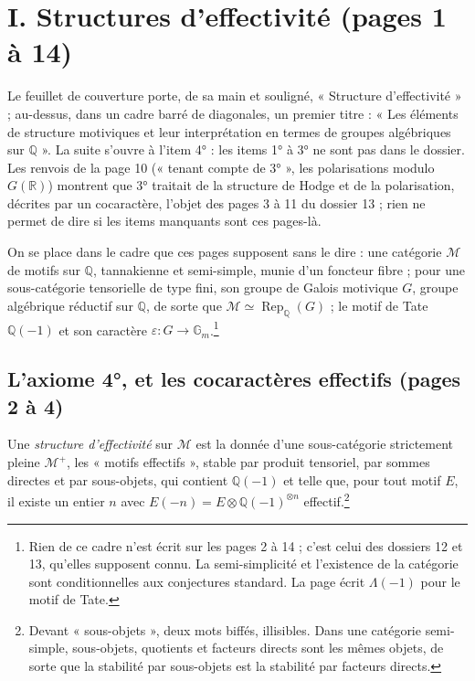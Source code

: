 \documentclass[11pt,a4paper]{article}
\begin{document}
\section*{I. Structures d'effectivité (pages 1 à 14)}

Le feuillet de couverture porte, de sa main et souligné, « Structure
d'effectivité » ; au-dessus, dans un cadre barré de diagonales, un premier
titre : « Les éléments de structure motiviques et leur interprétation en termes
de groupes algébriques sur $\mathbb{Q}$ ». La suite s'ouvre à l'item 4° : les
items 1° à 3° ne sont pas dans le dossier. Les renvois de la page 10
(« tenant compte de 3° », les polarisations modulo $G(\mathbb{R})$) montrent
que 3° traitait de la structure de Hodge et de la polarisation, décrites par un
cocaractère, l'objet des pages 3 à 11 du dossier 13 ; rien ne permet de dire
si les items manquants sont ces pages-là.

On se place dans le cadre que ces pages supposent sans le dire : une catégorie
$\mathcal{M}$ de motifs sur $\mathbb{Q}$, tannakienne et semi-simple, munie
d'un foncteur fibre ; pour une sous-catégorie tensorielle de type fini, son
groupe de Galois motivique $G$, groupe algébrique réductif sur $\mathbb{Q}$, de
sorte que $\mathcal{M} \simeq \operatorname{Rep}_{\mathbb{Q}}(G)$ ; le motif
de Tate $\mathbb{Q}(-1)$ et son caractère $\varepsilon \colon G \to
\mathbb{G}_{m}$.\footnote{Rien de ce cadre n'est écrit sur les pages 2 à 14 ;
c'est celui des dossiers 12 et 13, qu'elles supposent connu. La semi-simplicité
et l'existence de la catégorie sont conditionnelles aux conjectures standard.
La page écrit $\Lambda(-1)$ pour le motif de Tate.}

\subsection*{L'axiome 4°, et les cocaractères effectifs (pages 2 à 4)}

Une \emph{structure d'effectivité} sur $\mathcal{M}$ est la donnée d'une
sous-catégorie strictement pleine $\mathcal{M}^{+}$, les « motifs effectifs »,
stable par produit tensoriel, par sommes directes et par sous-objets, qui
contient $\mathbb{Q}(-1)$ et telle que, pour tout motif $E$, il existe un
entier $n$ avec $E(-n) = E \otimes \mathbb{Q}(-1)^{\otimes n}$
effectif.\footnote{Devant « sous-objets », deux mots biffés, illisibles. Dans
une catégorie semi-simple, sous-objets, quotients et facteurs directs sont les
mêmes objets, de sorte que la stabilité par sous-objets est la stabilité par
facteurs directs.}
\end{document}
